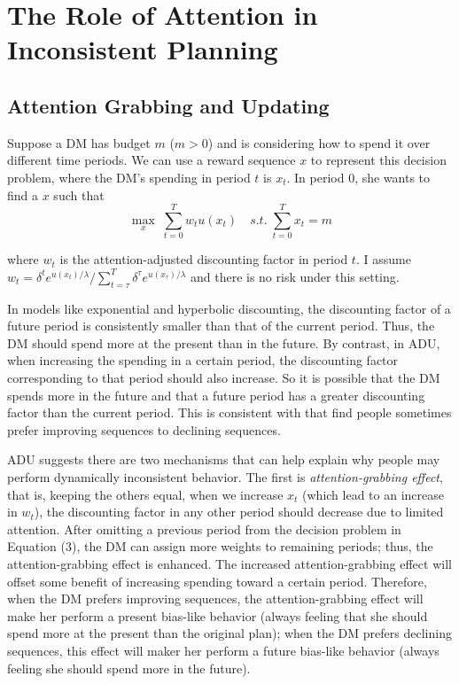 \documentclass[
  12pt,
]{article}
\begin{document}
\hypertarget{the-role-of-attention-in-inconsistent-planning}{%
\section{The Role of Attention in Inconsistent
Planning}\label{the-role-of-attention-in-inconsistent-planning}}

\hypertarget{attention-grabbing-and-updating}{%
\subsection{Attention Grabbing and
Updating}\label{attention-grabbing-and-updating}}

Suppose a DM has budget \(m\) (\(m>0\)) and is considering how to spend
it over different time periods. We can use a reward sequence \(x\) to
represent this decision problem, where the DM's spending in period \(t\)
is \(x_t\). In period 0, she wants to find a \(x\) such
that\[ \tag{3} \max_{x}\;\sum_{t=0}^T w_t u(x_t)\quad s.t. \;\sum_{t=0}^T x_t = m   \]

where \(w_t\) is the attention-adjusted discounting factor in period
\(t\). I assume
\(w_t=\delta^t e^{u(x_t)/\lambda}/\sum_{t=\tau}^T \delta^{\tau} e^{u(x_\tau)/\lambda}\)
and there is no risk under this setting.

In models like exponential and hyperbolic discounting, the discounting
factor of a future period is consistently smaller than that of the
current period. Thus, the DM should spend more at the present than in
the future. By contrast, in ADU, when increasing the spending in a
certain period, the discounting factor corresponding to that period
should also increase. So it is possible that the DM spends more in the
future and that a future period has a greater discounting factor than
the current period. This is consistent with
\citet{loewenstein_preferences_1993} that find people sometimes prefer
improving sequences to declining sequences.

ADU suggests there are two mechanisms that can help explain why people
may perform dynamically inconsistent behavior. The first is
\emph{attention-grabbing effect}, that is, keeping the others equal,
when we increase \(x_t\) (which lead to an increase in \(w_t\)), the
discounting factor in any other period should decrease due to limited
attention. After omitting a previous period from the decision problem in
Equation (3), the DM can assign more weights to remaining periods; thus,
the attention-grabbing effect is enhanced. The increased
attention-grabbing effect will offset some benefit of increasing
spending toward a certain period. Therefore, when the DM prefers
improving sequences, the attention-grabbing effect will make her perform
a present bias-like behavior (always feeling that she should spend more
at the present than the original plan); when the DM prefers declining
sequences, this effect will maker her perform a future bias-like
behavior (always feeling she should spend more in the future).
\end{document}
